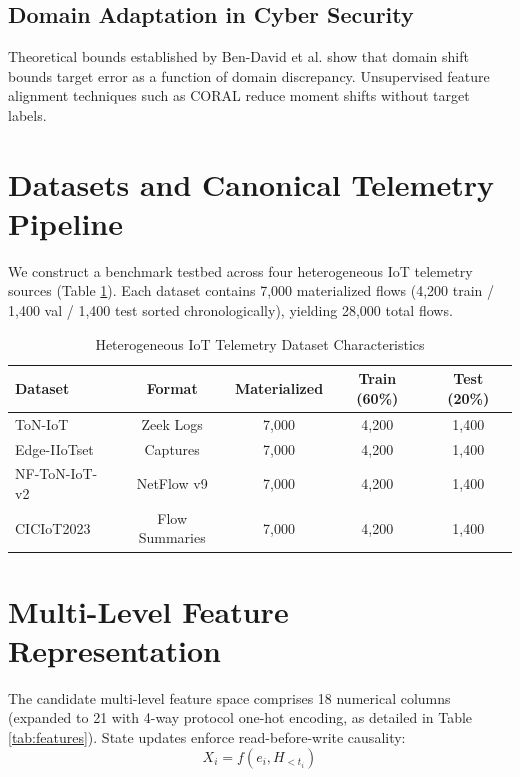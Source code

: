 \documentclass[10pt,journal,compsoc]{IEEEtran}
\begin{document}
\subsection{Domain Adaptation in Cyber Security}
Theoretical bounds established by Ben-David et al. \cite{bendavid2010theory} show that domain shift bounds target error as a function of domain discrepancy. Unsupervised feature alignment techniques such as CORAL \cite{sun2016return} reduce moment shifts without target labels.

\section{Datasets and Canonical Telemetry Pipeline}
We construct a benchmark testbed across four heterogeneous IoT telemetry sources (Table \ref{tab:datasets}). Each dataset contains 7,000 materialized flows (4,200 train / 1,400 val / 1,400 test sorted chronologically), yielding 28,000 total flows.

\begin{table}[htbp]
\caption{Heterogeneous IoT Telemetry Dataset Characteristics}
\label{tab:datasets}
\centering
\begin{tabular}{lcccc}
\toprule
\textbf{Dataset} & \textbf{Format} & \textbf{Materialized} & \textbf{Train (60\%)} & \textbf{Test (20\%)} \\
\midrule
ToN-IoT \cite{moustafa2021ton} & Zeek Logs & 7,000 & 4,200 & 1,400 \\
Edge-IIoTset \cite{ferrag2022edge} & Captures & 7,000 & 4,200 & 1,400 \\
NF-ToN-IoT-v2 \cite{sarhan2021towards} & NetFlow v9 & 7,000 & 4,200 & 1,400 \\
CICIoT2023 \cite{neto2023ciciot2023} & Flow Summaries & 7,000 & 4,200 & 1,400 \\
\bottomrule
\end{tabular}
\end{table}

\section{Multi-Level Feature Representation}
The candidate multi-level feature space comprises 18 numerical columns (expanded to 21 with 4-way protocol one-hot encoding, as detailed in Table \ref{tab:features}). State updates enforce read-before-write causality:
\begin{equation}
X_i = f(e_i, H_{<t_i})
\end{equation}
\end{document}
